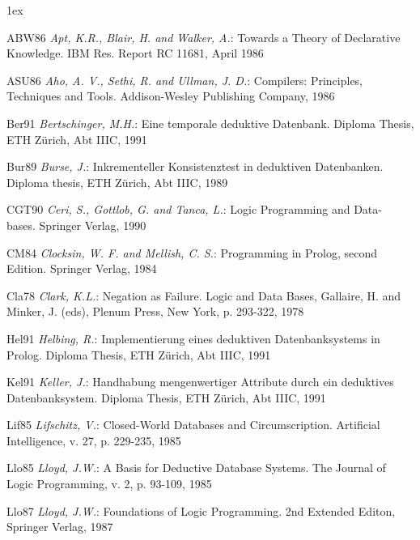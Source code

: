 \begin{list}{}{ 
\itemsep0.0cm 
\parsep1ex
\renewcommand{\makelabel}[1]{[#1]}}

\item[ABW86] {\it Apt, K.R., Blair, H. and Walker, A.}: Towards a Theory of Declarative
Knowledge. IBM Res. Report RC 11681, April 1986

\item[ASU86] {\it Aho, A. V., Sethi, R. and Ullman, J. D.}: Compilers: Principles, Techniques
and Tools. Addison-Wesley Publishing Company, 1986

\item[Ber91] {\it Bertschinger, M.H.}: Eine temporale deduktive 
Datenbank. Diploma Thesis, ETH Z\"urich, Abt IIIC, 1991

\item[Bur89] {\it Burse, J.}: Inkrementeller Konsistenztest in deduktiven Datenbanken.
Diploma thesis, ETH Z\"urich, Abt IIIC, 1989

\item[CGT90] {\it Ceri, S., Gottlob, G. and Tanca, L.}: Logic Programming and Data-
bases. Springer Verlag, 1990

\item[CM84] {\it Clocksin, W. F. and Mellish, C. S.}: Programming in Prolog, second
Edition. Springer Verlag, 1984

\item[Cla78] {\it Clark, K.L.}: Negation as Failure. Logic and Data Bases, 
Gallaire, H. and Minker, J. (eds), Plenum Press, New York, p. 293-322, 1978

\item[Hel91] {\it Helbing, R.}: Implementierung eines deduktiven Datenbanksystems
in Prolog. Diploma Thesis, ETH Z\"urich, Abt IIIC, 1991

\item[Kel91] {\it Keller, J.}: Handhabung mengenwertiger Attribute durch ein 
deduktives Datenbanksystem. Diploma Thesis, ETH Z\"urich, Abt IIIC, 1991

\item[Lif85] {\it Lifschitz, V.}: Closed-World Databases and Circumscription.
Artificial Intelligence, v. 27, p. 229-235, 1985

\item[Llo85] {\it Lloyd, J.W.}: A Basis for Deductive Database Systems. 
The Journal of Logic Programming, v. 2, p. 93-109, 1985

\item[Llo87] {\it Lloyd, J.W.}: Foundations of Logic Programming.
2nd Extended Editon, Springer Verlag, 1987


\end{list}
